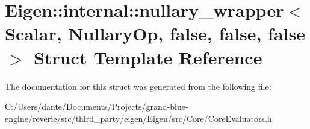 \hypertarget{struct_eigen_1_1internal_1_1nullary__wrapper_3_01_scalar_00_01_nullary_op_00_01false_00_01false_00_01false_01_4}{}\section{Eigen\+::internal\+::nullary\+\_\+wrapper$<$ Scalar, Nullary\+Op, false, false, false $>$ Struct Template Reference}
\label{struct_eigen_1_1internal_1_1nullary__wrapper_3_01_scalar_00_01_nullary_op_00_01false_00_01false_00_01false_01_4}


The documentation for this struct was generated from the following file\+:\begin{DoxyCompactItemize}
\item 
C\+:/\+Users/dante/\+Documents/\+Projects/grand-\/blue-\/engine/reverie/src/third\+\_\+party/eigen/\+Eigen/src/\+Core/Core\+Evaluators.\+h\end{DoxyCompactItemize}
